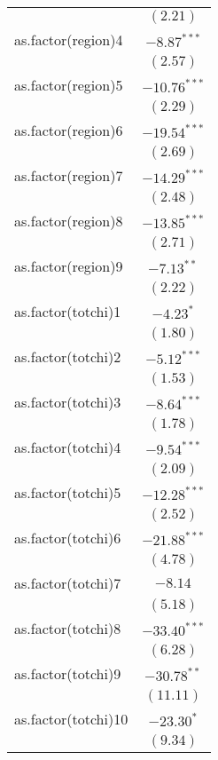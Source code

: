 \documentclass{article}
\begin{document}
\begin{table}
\begin{center}
\begin{tabular}{l c }
                    & $(2.21)$       \\
as.factor(region)4  & $-8.87^{***}$  \\
                    & $(2.57)$       \\
as.factor(region)5  & $-10.76^{***}$ \\
                    & $(2.29)$       \\
as.factor(region)6  & $-19.54^{***}$ \\
                    & $(2.69)$       \\
as.factor(region)7  & $-14.29^{***}$ \\
                    & $(2.48)$       \\
as.factor(region)8  & $-13.85^{***}$ \\
                    & $(2.71)$       \\
as.factor(region)9  & $-7.13^{**}$   \\
                    & $(2.22)$       \\
as.factor(totchi)1  & $-4.23^{*}$    \\
                    & $(1.80)$       \\
as.factor(totchi)2  & $-5.12^{***}$  \\
                    & $(1.53)$       \\
as.factor(totchi)3  & $-8.64^{***}$  \\
                    & $(1.78)$       \\
as.factor(totchi)4  & $-9.54^{***}$  \\
                    & $(2.09)$       \\
as.factor(totchi)5  & $-12.28^{***}$ \\
                    & $(2.52)$       \\
as.factor(totchi)6  & $-21.88^{***}$ \\
                    & $(4.78)$       \\
as.factor(totchi)7  & $-8.14$        \\
                    & $(5.18)$       \\
as.factor(totchi)8  & $-33.40^{***}$ \\
                    & $(6.28)$       \\
as.factor(totchi)9  & $-30.78^{**}$  \\
                    & $(11.11)$      \\
as.factor(totchi)10 & $-23.30^{*}$   \\
                    & $(9.34)$       \\

\end{tabular}
\end{center}
\end{table}
\end{document}
